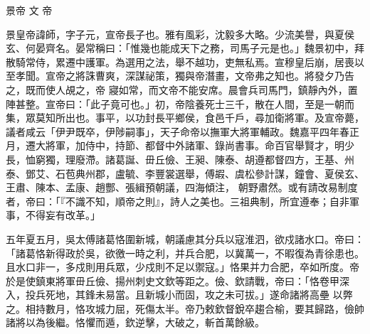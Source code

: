 
\begin{pinyinscope}

 景帝
 文
 帝



 景皇帝諱師，字子元，宣帝長子也。雅有風彩，沈毅多大略。少流美譽，與夏侯玄、何晏齊名。晏常稱曰：「惟幾也能成天下之務，司馬子元是也。」魏景初中，拜散騎常侍，累遷中護軍。為選用之法，舉不越功，吏無私焉。宣穆皇后崩，居喪以至孝聞。宣帝之將誅曹爽，深謀祕策，獨與帝潛畫，文帝弗之知也。將發夕乃告之，既而使人覘之，帝
 寢如常，而文帝不能安席。晨會兵司馬門，鎮靜內外，置陣甚整。宣帝曰：「此子竟可也。」初，帝陰養死士三千，散在人間，至是一朝而集，眾莫知所出也。事平，以功封長平鄉侯，食邑千戶，尋加衛將軍。及宣帝薨，議者咸云「伊尹既卒，伊陟嗣事」，天子命帝以撫軍大將軍輔政。魏嘉平四年春正月，遷大將軍，加侍中，持節、都督中外諸軍、錄尚書事。命百官舉賢才，明少長，恤窮獨，理廢滯。諸葛誕、毌丘儉、王昶、陳泰、胡遵都督四方，王基、州泰、鄧艾、石苞典州郡，盧毓、李豐裳選舉，傅嘏、虞松參計謀，鐘會、夏侯玄、王肅、陳本、孟康、趙酆、張緝預朝議，四海傾注，
 朝野肅然。或有請改易制度者，帝曰：「『不識不知，順帝之則』，詩人之美也。三祖典制，所宜遵奉；自非軍事，不得妄有改革。」



 五年夏五月，吳太傅諸葛恪圍新城，朝議慮其分兵以寇淮泗，欲戍諸水口。帝曰：「諸葛恪新得政於吳，欲徼一時之利，并兵合肥，以冀萬一，不暇復為青徐患也。且水口非一，多戍則用兵眾，少戍則不足以禦寇。」恪果并力合肥，卒如所度。帝於是使鎮東將軍毌丘儉、揚州刺史文欽等距之。儉、欽請戰，帝曰：「恪卷甲深入，投兵死地，其鋒未易當。且新城小而固，攻之未可拔。」遂命諸將高壘
 以弊之。相持數月，恪攻城力屈，死傷太半。帝乃敕欽督銳卒趨合榆，要其歸路，儉帥諸將以為後繼。恪懼而遁，欽逆擊，大破之，斬首萬餘級。




\end{pinyinscope}
